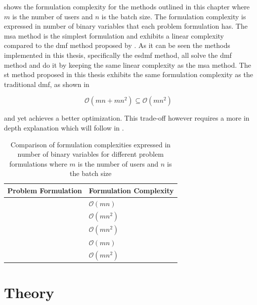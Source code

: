  shows the formulation complexity for the methods outlined in this chapter where $m$ is the number of users and $n$ is the batch size. The formulation complexity is expressed in number of binary variables that each problem formulation has. The \gls{msa} method is the simplest formulation and exhibits a linear complexity compared to the \gls{dmf} method proposed by \citet{Zeng2005}. As it can be seen the methods implemented in this thesis, specifically the \gls{esdmf} method, all solve the \gls{dmf} method and do it by keeping the same linear complexity as the \gls{msa} method. The \gls{st} method proposed in this thesis exhibits the same formulation complexity as the traditional \gls{dmf}, as shown in 

\begin{equation}
\label{eq:st_complexity}
	\mathcal{O}(mn+mn^2) \subseteq \mathcal{O}(mn^2)
\end{equation}
 
and yet achieves a better optimization. This trade-off however requires a more in depth explanation which will follow in .

\begin{table}[!ht]
	\centering
		\begin{tabular}{@{}ll@{}}
		\toprule
		Problem Formulation & Formulation Complexity \\ \midrule
		\glsentryshort{msa}    & $\mathcal{O}(mn)$           \\
		\glsentryshort{dmf}   & $\mathcal{O}(mn^2)$         \\
		\glsentryshort{sdmf}  & $\mathcal{O}(mn^2)$         \\
		\glsentryshort{esdmf}  & $\mathcal{O}(mn)$           \\
		\glsentryshort{st} 	   & $\mathcal{O}(mn^2)$ \\	\bottomrule
		\end{tabular}
	\caption{Comparison of formulation complexities expressed in number of binary variables for different problem formulations where $m$ is the number of users and $n$ is the batch size}
	\label{tab:big_oh_formulations}
\end{table}

\section{ Theory}
\label{sec:rl_theory}

